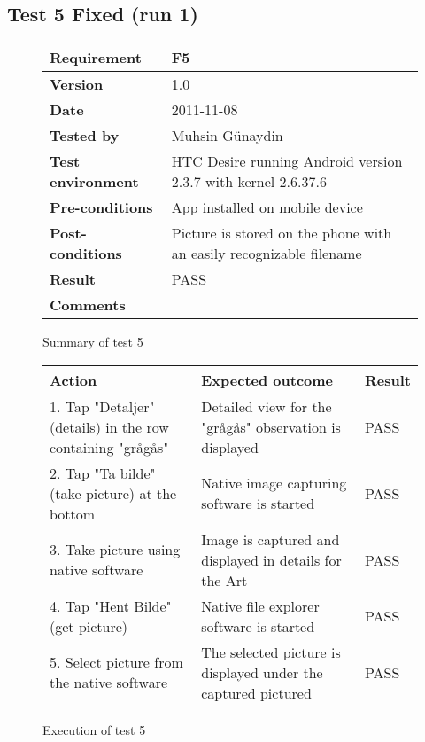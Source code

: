 
\subsection{Test 5 Fixed (run 1)}

	\begin{figure}[htb]
		\centering
		\begin{tabular}{|p{3.5cm}|p{7.0cm}|} \hline
			\textbf{Requirement} & F5 \\ \hline
			\textbf{Version} & 1.0 \\ \hline
			\textbf{Date} & 2011-11-08 \\ \hline
			\textbf{Tested by} & Muhsin Günaydin \\ \hline
			\textbf{Test environment} & HTC Desire running Android version 2.3.7 with kernel 2.6.37.6 \\ \hline
			\textbf{Pre-conditions} & App installed on mobile device \\ \hline
			\textbf{Post-conditions} & Picture is stored on the phone with an easily recognizable filename \\ \hline
			\textbf{Result} & PASS \\ \hline
			\textbf{Comments} & \\ \hline
		\end{tabular}
		\caption{Summary of test 5}
	\end{figure}

	\begin{figure}[htb]
		\centering
		\begin{tabular}{|p{5.0cm}|p{5.0cm}|p{1cm}|}
			\hline \textbf{Action} & \textbf{Expected outcome} & \textbf{Result} \\ \hline
			1. Tap "Detaljer" (details) in the row containing "grågås"  &
			Detailed view for the "grågås" observation is displayed & 
			PASS \\ \hline

			2. Tap "Ta bilde" (take picture) at the bottom &
			Native image capturing software is started &
			PASS\\ \hline

			3. Take picture using native software &
			Image is captured and displayed in details for the Art &
			PASS\\ \hline
			
			4. Tap "Hent Bilde" (get picture) &
			Native file explorer software is started &
			PASS\\ \hline

			5. Select picture from the native software &
			The selected picture is displayed under the captured pictured &
			PASS\\ \hline
		
		\end{tabular}
		\caption{Execution of test 5}
	\end{figure}


\newpage
